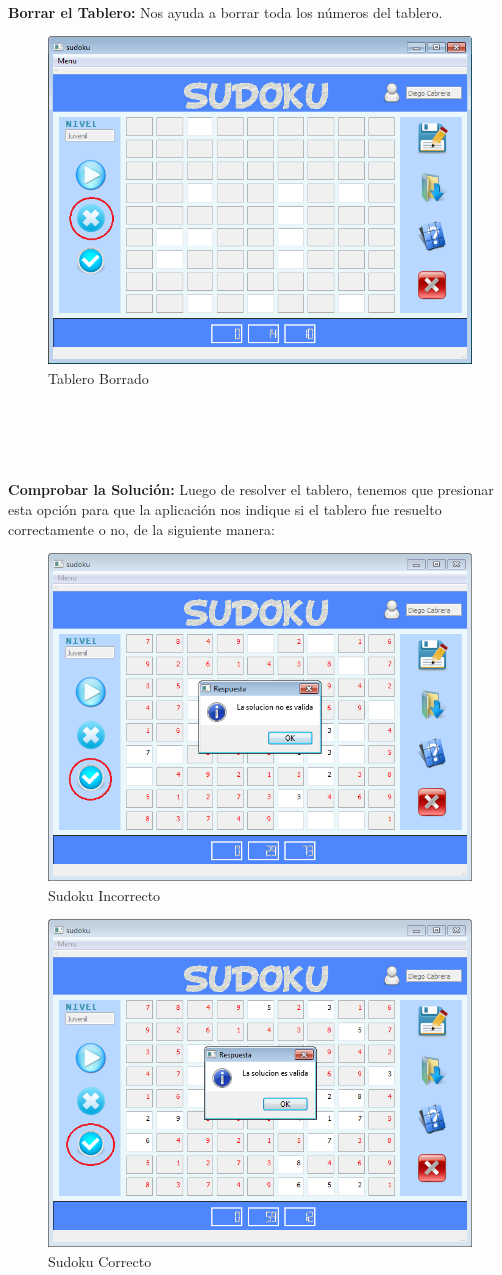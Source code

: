 \ \\ \textbf{Borrar el Tablero:} Nos ayuda a borrar toda los números del tablero.

\begin{figure}[htbp]
\begin{center}
\includegraphics[width=.50\textwidth]{./imagenes/Tablero1.png}
\caption{Tablero Borrado}
\label{Tablero Borrado}
\end{center}
\end{figure} 

\ \\ \ \\ \ \\ \ \\
\textbf{Comprobar la Solución:} Luego de resolver el tablero, tenemos que presionar esta opción para que la aplicación nos indique si el tablero fue resuelto correctamente o no, de la siguiente manera:

\begin{figure}[htbp]
\begin{center}
\includegraphics[width=.50\textwidth]{./imagenes/SudokuNo.png}
\caption{Sudoku Incorrecto}
\label{Sudoku Incorrecto}
\end{center}
\end{figure} 

\begin{figure}[htbp]
\begin{center}
\includegraphics[width=.50\textwidth]{./imagenes/SudokuSi.png}
\caption{Sudoku Correcto}
\label{Sudoku Correcto}
\end{center}
\end{figure} 

